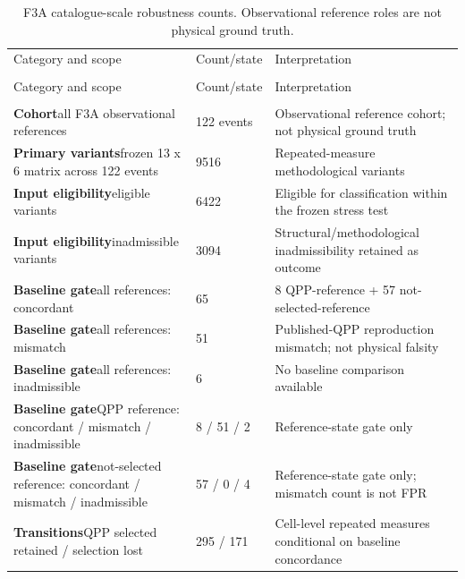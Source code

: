 \begin{longtable}{@{}p{}p{}p{}@{}}
\caption{F3A catalogue-scale robustness counts. Observational reference roles are not physical ground truth.}\label{tab:f3a_counts}\\\\
\toprule
Category and scope & Count/state & Interpretation \\\\
\midrule
\endfirsthead
\toprule
Category and scope & Count/state & Interpretation \\\\
\midrule
\endhead
\textbf{Cohort}\newline all F3A observational references & 122 events & Observational reference cohort; not physical ground truth \\
\textbf{Primary variants}\newline frozen 13 x 6 matrix across 122 events & 9516 & Repeated-measure methodological variants \\
\textbf{Input eligibility}\newline eligible variants & 6422 & Eligible for classification within the frozen stress test \\
\textbf{Input eligibility}\newline inadmissible variants & 3094 & Structural/methodological inadmissibility retained as outcome \\
\textbf{Baseline gate}\newline all references: concordant & 65 & 8 QPP-reference + 57 not-selected-reference \\
\textbf{Baseline gate}\newline all references: mismatch & 51 & Published-QPP reproduction mismatch; not physical falsity \\
\textbf{Baseline gate}\newline all references: inadmissible & 6 & No baseline comparison available \\
\textbf{Baseline gate}\newline QPP reference: concordant / mismatch / inadmissible & 8 / 51 / 2 & Reference-state gate only \\
\textbf{Baseline gate}\newline not-selected reference: concordant / mismatch / inadmissible & 57 / 0 / 4 & Reference-state gate only; mismatch count is not FPR \\
\textbf{Transitions}\newline QPP selected retained / selection lost & 295 / 171 & Cell-level repeated measures conditional on baseline concordance \\

\end{longtable}

